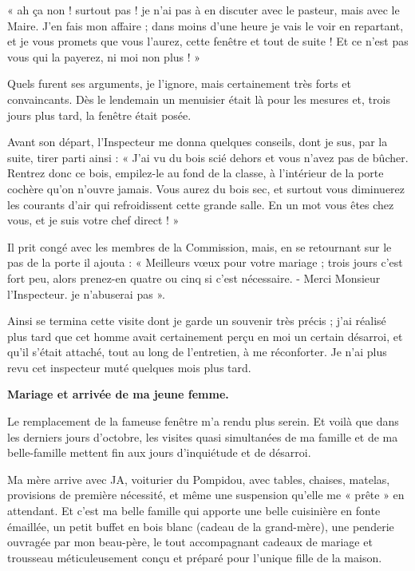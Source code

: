 « ah ça non ! surtout pas ! je n’ai pas à en discuter avec le pasteur, mais avec le Maire. J’en
fais mon affaire ; dans moins d’une heure je vais le voir en repartant, et je vous promets que
vous l’aurez, cette fenêtre et tout de suite ! Et ce n’est pas vous qui la payerez, ni moi non
plus ! »

Quels furent ses arguments, je l’ignore, mais certainement très forts et convaincants. Dès le
lendemain un menuisier était là pour les mesures et, trois jours plus tard, la fenêtre était posée.

Avant son départ, l’Inspecteur me donna quelques conseils, dont je sus, par la suite, tirer
parti ainsi :
« J’ai vu du bois scié dehors et vous n’avez pas de bûcher. Rentrez donc ce bois, empilez-le
au fond de la classe, à l’intérieur de la porte cochère qu’on n’ouvre jamais. Vous aurez du bois
sec, et surtout vous diminuerez les courants d’air qui refroidissent cette grande salle. En un
mot vous êtes chez vous, et je suis votre chef direct ! »


Il prit congé avec les membres de la Commission, mais, en se retournant sur le pas de la porte
il ajouta :
« Meilleurs vœux pour votre mariage ; trois jours c’est fort peu, alors prenez-en quatre ou
cinq si c’est nécessaire.
- Merci Monsieur l’Inspecteur. je n’abuserai pas ».

Ainsi se termina cette visite dont je garde un souvenir très précis ; j’ai réalisé plus tard que cet
homme avait certainement perçu en moi un certain désarroi, et qu’il s’était attaché, tout au
long de l’entretien, à me réconforter. Je n’ai plus revu cet inspecteur muté quelques mois plus
tard.

\textbf{Mariage et arrivée de ma jeune femme.}

Le remplacement de la fameuse fenêtre m’a rendu plus serein. Et voilà que dans les derniers
jours d’octobre, les visites quasi simultanées de ma famille et de ma belle-famille mettent fin
aux jours d’inquiétude et de désarroi.

Ma mère arrive avec JA, voiturier du Pompidou, avec tables, chaises, matelas, provisions de
première nécessité, et même une suspension qu’elle me « prête » en attendant. Et c’est ma
belle famille qui apporte une belle cuisinière en fonte émaillée, un petit buffet en bois blanc
(cadeau de la grand-mère), une penderie ouvragée par mon beau-père, le tout accompagnant
cadeaux de mariage et trousseau méticuleusement conçu et préparé pour l’unique fille de la
maison.

